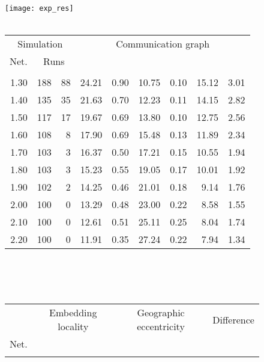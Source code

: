 \documentclass{article}
\begin{document}
\begin{figure}[h]
\begin{center}
\texttt{[image: exp\_res]}
~\\~\\
\begin{tabular}{|r|rr|rr|rr|rr|}
\hline
\multicolumn{3}{|c|}{Simulation} & \multicolumn{6}{|c|}{Communication graph}\\
\multicolumn{1}{|c}{Net.} & \multicolumn{2}{c|}{Runs} & \multicolumn{2}{|c}{} & \multicolumn{2}{c}{} & \multicolumn{2}{c|}{}\\
\hline
\multicolumn{1}{|c|}{} & \multicolumn{1}{|c}{} & \multicolumn{1}{c|}{} & \multicolumn{1}{|c}{} & \multicolumn{1}{c|}{} & \multicolumn{1}{|c}{} & \multicolumn{1}{c|}{} & \multicolumn{1}{|c}{} & \multicolumn{1}{c|}{}\\
1.30 & 188 & 88 & 24.21 & 0.90 & 10.75 & 0.10 & 15.12 & 3.01\\
1.40 & 135 & 35 & 21.63 & 0.70 & 12.23 & 0.11 & 14.15 & 2.82\\
1.50 & 117 & 17 & 19.67 & 0.69 & 13.80 & 0.10 & 12.75 & 2.56\\
1.60 & 108 &  8 & 17.90 & 0.69 & 15.48 & 0.13 & 11.89 & 2.34\\
1.70 & 103 &  3 & 16.37 & 0.50 & 17.21 & 0.15 & 10.55 & 1.94\\
1.80 & 103 &  3 & 15.23 & 0.55 & 19.05 & 0.17 & 10.01 & 1.92\\
1.90 & 102 &  2 & 14.25 & 0.46 & 21.01 & 0.18 &  9.14 & 1.76\\
2.00 & 100 &  0 & 13.29 & 0.48 & 23.00 & 0.22 &  8.58 & 1.55\\
2.10 & 100 &  0 & 12.61 & 0.51 & 25.11 & 0.25 &  8.04 & 1.74\\ 
2.20 & 100 &  0 & 11.91 & 0.35 & 27.24 & 0.22 &  7.94 & 1.34\\
\hline
\end{tabular}\\
~\\~\\
\begin{tabular}{|r|rr|rr|rr|rr|rr|}
\hline
& \multicolumn{4}{|c|}{Embedding locality} & \multicolumn{4}{|c|}{Geographic eccentricity} & \multicolumn{2}{|c|}{Difference}\\
Net. & \multicolumn{2}{c}{} & \multicolumn{2}{c|}{} & \multicolumn{2}{c}{} & \multicolumn{2}{c|}{}&  & \\
\hline
\multicolumn{1}{|c|}{} & \multicolumn{1}{|c}{} & \multicolumn{1}{c|}{} & \multicolumn{1}{|c}{} & \multicolumn{1}{c|}{} & \multicolumn{1}{|c}{} & \multicolumn{1}{c|}{} & \multicolumn{1}{|c}{} & \multicolumn{1}{c|}{} & \multicolumn{1}{|c}{} & \multicolumn{1}{c|}{}\\

\end{tabular}
\end{center}
\end{figure}
\end{document}
